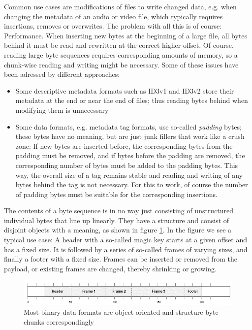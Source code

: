 \documentclass[english, 10pt, openright, twocolumn, landscape, twoside, notitlepage, a4paper, pdftex]		
{article}
\begin{document}
Common use cases are modifications of files to write changed data, e.g. when changing the metadata of an audio or video file, which typically requires insertions, removes or overwrites. The problem with all this is of course: Performance. When inserting new bytes at the beginning of a large file, all bytes behind it must be read and rewritten at the correct higher offset. Of course, reading large byte sequences requires corresponding amounts of memory, so a chunk-wise reading and writing might be necessary. Some of these issues have been adressed by different approaches:
\begin{itemize}
\item Some descriptive metadata formats such as ID3v1 and ID3v2 store their metadata at the end or near the end of files; thus reading bytes behind when modifying them is unnecessary
\item Some data formats, e.g. metadata tag formats, use so-called \emph{padding} bytes; these bytes have no meaning, but are just junk fillers that work like a crush zone: If new bytes are inserted before, the corresponding bytes from the padding must be removed, and if bytes before the padding are removed, the corresponding number of bytes must be added to the padding bytes. This way, the overall size of a tag remains stable and reading and writing of any bytes behind the tag is not necessary. For this to work, of course the number of padding bytes must be suitable for the corresponding insertions.
\end{itemize}

The contents of a byte sequence is in no way just consisting of unstructured individual bytes that line up linearly. They have a structure and consist of disjoint objects with a meaning, as shown in figure \ref{fig:Objects}. In the figure we see a typical use case: A header with a so-called magic key starts at a given offset and has a fixed size. It is followed by a series of so-called frames of varying sizes, and finally a footer with a fixed size. Frames can be inserted or removed from the payload, or existing frames are changed, thereby shrinking or growing.

\begin{figure}[htbp]
\centering
\includegraphics[width=1.00\columnwidth]{figures/Objects.png}
\caption{Most binary data formats are object-oriented and structure byte chunks correspondingly}
\label{fig:Objects}
\end{figure}
\end{document}
